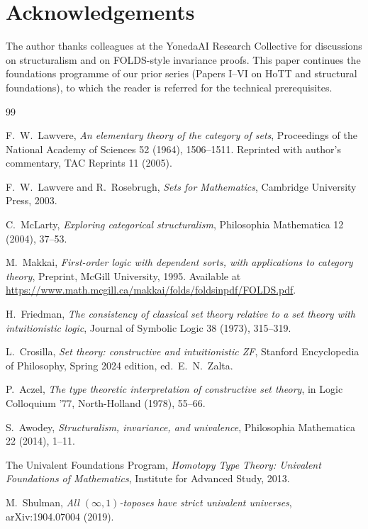 \documentclass[12pt]{article}
\theoremstyle{definition}
\theoremstyle{remark}
\begin{document}
\section*{Acknowledgements}

The author thanks colleagues at the YonedaAI Research Collective for discussions on
structuralism and on FOLDS-style invariance proofs. This paper continues the
foundations programme of our prior series (Papers I--VI on HoTT and structural
foundations), to which the reader is referred for the technical prerequisites.

\begin{thebibliography}{99}

F.\ W.\ Lawvere,
\emph{An elementary theory of the category of sets},
Proceedings of the National Academy of Sciences 52 (1964), 1506--1511.
Reprinted with author's commentary, TAC Reprints 11 (2005).

F.\ W.\ Lawvere and R.\ Rosebrugh,
\emph{Sets for Mathematics},
Cambridge University Press, 2003.

C.\ McLarty,
\emph{Exploring categorical structuralism},
Philosophia Mathematica 12 (2004), 37--53.

M.\ Makkai,
\emph{First-order logic with dependent sorts, with applications to category theory},
Preprint, McGill University, 1995.
Available at \url{https://www.math.mcgill.ca/makkai/folds/foldsinpdf/FOLDS.pdf}.

H.\ Friedman,
\emph{The consistency of classical set theory relative to a set theory with intuitionistic
logic},
Journal of Symbolic Logic 38 (1973), 315--319.

L.\ Crosilla,
\emph{Set theory: constructive and intuitionistic ZF},
Stanford Encyclopedia of Philosophy, Spring 2024 edition, ed.\ E.\ N.\ Zalta.

P.\ Aczel,
\emph{The type theoretic interpretation of constructive set theory},
in Logic Colloquium '77, North-Holland (1978), 55--66.

S.\ Awodey,
\emph{Structuralism, invariance, and univalence},
Philosophia Mathematica 22 (2014), 1--11.

The Univalent Foundations Program,
\emph{Homotopy Type Theory: Univalent Foundations of Mathematics},
Institute for Advanced Study, 2013.

M.\ Shulman,
\emph{All $(\infty,1)$-toposes have strict univalent universes},
arXiv:1904.07004 (2019).


\end{thebibliography}
\end{document}
